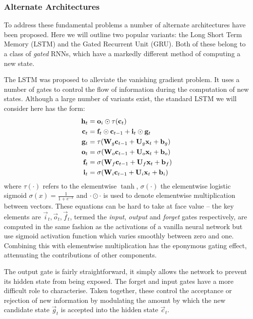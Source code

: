 \subsubsection{Alternate Architectures}
To address these fundamental problems a number of alternate architectures have been proposed.
Here we will outline two popular variants: the Long Short Term Memory (LSTM) and the Gated
Recurrent Unit (GRU). Both of these belong to a class of \emph{gated} RNNs, which have a
markedly different method of computing a new state.

The LSTM was proposed to alleviate the vanishing gradient problem. It uses a number of gates
to control the flow of information during the computation of new states. Although a large number
of variants exist, the standard LSTM we will consider here has the form: 
\autocite{Hochreiter1997, Graves2013}
\begin{align}\label{eq:LSTM}
	\mathbf{h}_t &= \mathbf{o}_i \odot \tau(\mathbf{c}_t)\\
	\mathbf{c}_t &= \mathbf{f}_t \odot \mathbf{c}_{t-1} + \mathbf{i}_t \odot \mathbf{g}_t\\
	\mathbf{g}_t &= \tau(\mathbf{W}_g \mathbf{c}_{t-1} + \mathbf{U}_g \mathbf{x}_t + \mathbf{b}_g)\\
	\mathbf{o}_t &= \sigma(\mathbf{W}_o \mathbf{c}_{t-1} + \mathbf{U}_o \mathbf{x}_t + \mathbf{b}_o)\\
	\mathbf{f}_t &= \sigma(\mathbf{W}_f \mathbf{c}_{t-1} + \mathbf{U}_f \mathbf{x}_t + \mathbf{b}_f)\\
	\mathbf{i}_t &= \sigma(\mathbf{W}_i \mathbf{c}_{t-1} + \mathbf{U}_i \mathbf{x}_t + \mathbf{b}_i)
\end{align} where \(\tau(\cdot)\) refers to the elementwise \(\tanh\), \(\sigma(\cdot)\) the
elementwise logistic sigmoid \(\sigma(x) = \frac{1}{1 + e^{-x}}\) and \(\cdot \odot \cdot\)
is used to denote elementwise multiplication between vectors. These equations can be hard to take
at face value -- the key elements are \(\vec{i}_t, \vec{o}_t, \vec{f}_t\), termed the
\emph{input}, \emph{output} and \emph{forget} gates respectively, are computed in the same fashion
as the activations of a vanilla neural network but use sigmoid activation function which varies
smoothly between zero and one. Combining this with elementwise multiplication has the eponymous
gating effect, attenuating the contributions of other components. 

The output gate is fairly straightforward, it simply allows the network to prevent its hidden
state from being exposed. The forget and input gates have a more difficult role to characterise.
Taken together, these control the acceptance or rejection of new information by modulating the
amount by which the new candidate state \(\vec{g}_t\) is accepted into the hidden state
\(\vec{c}_t\).

